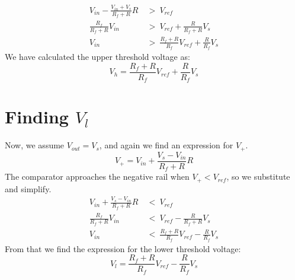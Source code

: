 \documentclass{article}
\begin{document}
\begin{align*}
    V_{in} - \frac{V_{in} + V_s}{R_f+R} R \ &>\ V_{ref}\\
    \frac{R_f}{R_f+R} V_{in} \ &>\ V_{ref} + \frac{R}{R_f+R} V_s\\
    V_{in} \ &>\ \frac{R_f + R}{R_f} V_{ref} + \frac{R}{R_f} V_s
\end{align*}
\noindent
We have calculated the upper threshold voltage as:
\begin{equation*}
    \boxed{V_h = \frac{R_f + R}{R_f} V_{ref} + \frac{R}{R_f} V_s}
\end{equation*}

\section*{Finding $V_l$}
Now, we assume $V_{out} = V_s$, and again we find an expression for $V_+$.
\begin{equation*}
    V_+ = V_{in} + \frac{V_s - V_{in}}{R_f+R} R
\end{equation*}
\noindent
The comparator approaches the negative rail when $V_+ < V_{ref}$, so we substitute and simplify.
\begin{align*}
    V_{in} + \frac{V_s - V_{in}}{R_f+R} R \ &< \ V_{ref}\\
    \frac{R_f}{R_f+R} V_{in} \ &<\ V_{ref} - \frac{R}{R_f+R} V_s\\
    V_{in} \ &<\ \frac{R_f + R}{R_f} V_{ref} - \frac{R}{R_f} V_s
\end{align*}
\noindent
From that we find the expression for the lower threshold voltage:
\begin{equation*}
    \boxed{V_l = \frac{R_f + R}{R_f} V_{ref} - \frac{R}{R_f} V_s}
\end{equation*}
\end{document}
